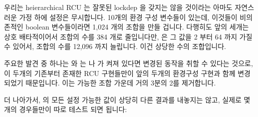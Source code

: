 우리는 heierarchical RCU 는 잘못된 lockdep 을 갖지는 않을 것이라는 아마도
자연스러운 가정 하에  설정은 무시합니다.
10개의 환경 구성 변수들이 있는데, 이것들이 비의존적인 boolean 변수들이라면
1,024 개의 조합을 만들 겁니다.
다행히도 앞의 세개는 상호 배타적이어서 조합의 수를 384 개로 줄입니다만,
 은 그 값을 2 부터 64 까지 가질 수 있어서, 조합의 수를
12,096 까지 늘립니다.
이건 상당한 수의 조합입니다.

주요한 발견 중 하나는  와  는
 나  가 켜져 있다면 변경된 동작을
취할 수 있다는 것으로, 이 두개의 기존부터 존재한 RCU 구현들만이 앞의 두개의
환경구성 구현과 함께 변경되었기 때문입니다.
이는 가능한 조합 가운데 거의 3분의 2를 제거합니다.

더 나아가서,  의 모든 설정 가능한 값이 상당히 다른 결과를
내놓지는 않고, 실제로 몇개의 경우들만이 따로 테스트 되면 됩니다:
\iffalse

We ignore the \co{CONFIG_DEBUG_LOCK_ALLOC} configuration
variable under the perhaps-naive assumption that hierarchical RCU
could not have broken lockdep.
There are still 10 configuration variables, which would result in
1,024 combinations if they were independent boolean variables.
Fortunately the first three are mutually exclusive, which reduces
the number of combinations down to 384, but \co{CONFIG_RCU_FANOUT}
can take on values from 2 to 64, increasing the number of combinations
to 12,096.
This is an infeasible number of combinations.

One key observation is that only \co{CONFIG_NO_HZ}
and \co{CONFIG_PREEMPT} can be expected to have changed behavior
if either \co{CONFIG_CLASSIC_RCU} or
\co{CONFIG_PREEMPT_RCU} are in effect, as only these portions
of the two pre-existing RCU implementations were changed during this effort.
This cuts out almost two thirds of the possible combinations.

Furthermore, not all of the possible values of
\co{CONFIG_RCU_FANOUT} produce significantly different results,
in fact only a few cases really need to be tested separately:
\fi

